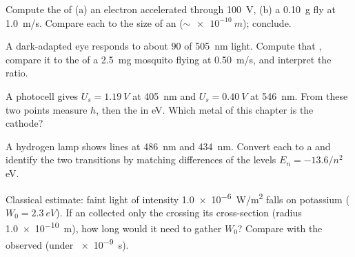 \begin{exercise}[$\star\star$]\label{exo:g12:quantum-world:10}
Compute the  of (a) an electron accelerated through
\qty{100}{V}, (b) a \qty{0.10}{g} fly at \qty{1.0}{m/s}. Compare each to
the size of an  ($\sim \qty{e-10}{m}$); conclude.
\end{exercise}

\begin{exercise}[$\star\star$]\label{exo:g12:quantum-world:11}
A dark-adapted eye responds to about $90$  of \qty{505}{nm} light.
Compute that , compare it to the  of a \qty{2.5}{mg}
mosquito flying at \qty{0.50}{m/s}, and interpret the ratio.
\end{exercise}

\begin{exercise}[$\star\star\star$]\label{exo:g12:quantum-world:12}
A photocell gives $U_s = \qty{1.19}{V}$ at \qty{405}{nm} and $U_s =
\qty{0.40}{V}$ at \qty{546}{nm}. From these two points measure $h$, then
the  in \unit{eV}. Which metal of this chapter is the cathode?
\end{exercise}

\begin{exercise}[$\star\star\star$]\label{exo:g12:quantum-world:13}
A hydrogen lamp shows lines at \qty{486}{nm} and \qty{434}{nm}. Convert
each to a   and identify the two transitions by matching
differences of the levels $E_n = -13.6/n^2$ \unit{eV}.
\end{exercise}

\begin{exercise}[$\star\star\star$]\label{exo:g12:quantum-world:14}
Classical  estimate: faint light of intensity \qty{1.0e-6}{W/m^2}
falls on potassium ($W_0 = \qty{2.3}{eV}$). If an  collected only the
 crossing its cross-section (radius \qty{1.0e-10}{m}), how long would
it need to gather $W_0$? Compare with the observed  (under \qty{e-9}{s}).
\end{exercise}

